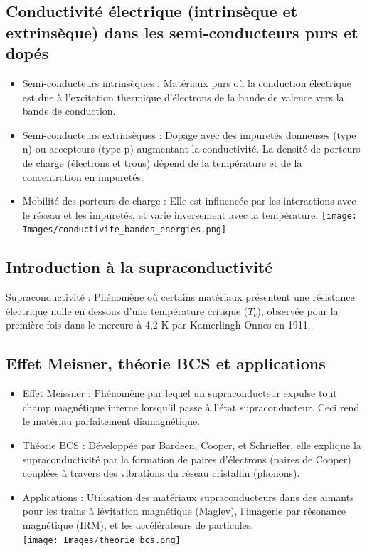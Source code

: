 \documentclass{article}
\begin{document}
    \subsection{Conductivité électrique (intrinsèque et extrinsèque) dans les semi-conducteurs purs et dopés}
    \begin{itemize}
        \item Semi-conducteurs intrinsèques : Matériaux purs où la conduction électrique est due à l'excitation thermique d'électrons de la bande de valence vers la bande de conduction.
        \item Semi-conducteurs extrinsèques : Dopage avec des impuretés donneuses (type n) ou accepteurs (type p) augmentant la conductivité. La densité de porteurs de charge (électrons et trous) dépend de la température et de la concentration en impuretés.
        \item Mobilité des porteurs de charge : Elle est influencée par les interactions avec le réseau et les impuretés, et varie inversement avec la température.
        \texttt{[image: Images/conductivite\_bandes\_energies.png]}
    \end{itemize}

    \subsection{Introduction à la supraconductivité}
    Supraconductivité : Phénomène où certains matériaux présentent une résistance électrique nulle en dessous d'une température critique ($T_c$), observée pour la première fois dans le mercure à 4,2 K par Kamerlingh Onnes en 1911.

    \subsection{Effet Meisner, théorie BCS et applications}
    \begin{itemize}
        \item Effet Meissner : Phénomène par lequel un supraconducteur expulse tout champ magnétique interne lorsqu'il passe à l'état supraconducteur. Ceci rend le matériau parfaitement diamagnétique.
        \item Théorie BCS : Développée par Bardeen, Cooper, et Schrieffer, elle explique la supraconductivité par la formation de paires d'électrons (paires de Cooper) couplées à travers des vibrations du réseau cristallin (phonons).
        \item Applications : Utilisation des matériaux supraconducteurs dans des aimants pour les trains à lévitation magnétique (Maglev), l'imagerie par résonance magnétique (IRM), et les accélérateurs de particules. \\
            \texttt{[image: Images/theorie\_bcs.png]}
    \end{itemize}
\end{document}
